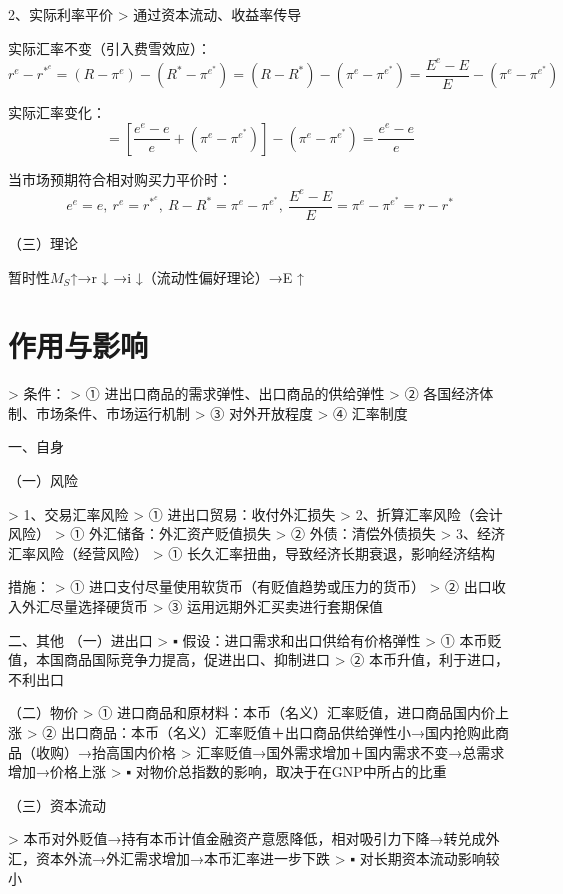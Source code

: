 \documentclass[12pt]{book}
\begin{document}
2、实际利率平价
> 通过资本流动、收益率传导

实际汇率不变（引入费雪效应）：
$$
  r^e-r^{\ast^e}=\left(R-\pi^e\right)-\left(R^\ast-\pi^{e^\ast}\right)=\left(R-R^\ast\right)-\left(\pi^e-\pi^{e^\ast}\right)=\frac{E^e-E}{E}-\left(\pi^e-\pi^{e^\ast}\right)
$$

实际汇率变化：
$$
  =\left[\frac{e^e-e}{e}+\left(\pi^e-\pi^{e^\ast}\right)\right]-\left(\pi^e-\pi^{e^\ast}\right)=\frac{e^e-e}{e}
$$

当市场预期符合相对购买力平价时：
$$
  e^e=e,\ r^e=r^{\ast^e},\ R-R^\ast=\pi^e-\pi^{e^\ast},\ \frac{E^e-E}{E}=\pi^e-\pi^{e^\ast}=r-r^\ast
$$

（三）理论

暂时性$M_S$↑→r ↓ →i ↓（流动性偏好理论）→E ↑












\section{作用与影响}




> 条件：  
> ① 进出口商品的需求弹性、出口商品的供给弹性  
> ② 各国经济体制、市场条件、市场运行机制  
> ③ 对外开放程度   
> ④ 汇率制度


一、自身	

（一）风险	

> 1、交易汇率风险  
> ① 进出口贸易：收付外汇损失  
> 2、折算汇率风险（会计风险）  
> ① 外汇储备：外汇资产贬值损失  
> ② 外债：清偿外债损失  
> 3、经济汇率风险（经营风险）  
> ① 长久汇率扭曲，导致经济长期衰退，影响经济结构

措施：
> ① 进口支付尽量使用软货币（有贬值趋势或压力的货币）  
> ② 出口收入外汇尽量选择硬货币  
> ③ 运用远期外汇买卖进行套期保值

二、其他	
（一）进出口
> ▪ 假设：进口需求和出口供给有价格弹性  
> ① 本币贬值，本国商品国际竞争力提高，促进出口、抑制进口    
> ② 本币升值，利于进口，不利出口  


（二）物价	
> ① 进口商品和原材料：本币（名义）汇率贬值，进口商品国内价上涨  
> ② 出口商品：本币（名义）汇率贬值＋出口商品供给弹性小→国内抢购此商品（收购）→抬高国内价格   
> 汇率贬值→国外需求增加＋国内需求不变→总需求增加→价格上涨  
> ▪ 对物价总指数的影响，取决于在GNP中所占的比重

（三）资本流动	

> 本币对外贬值→持有本币计值金融资产意愿降低，相对吸引力下降→转兑成外汇，资本外流→外汇需求增加→本币汇率进一步下跌  
> ▪ 对长期资本流动影响较小
\end{document}
